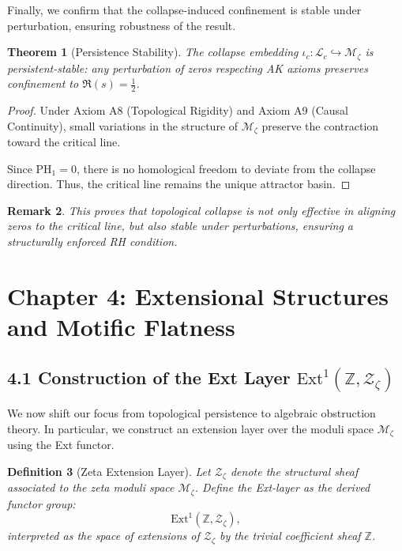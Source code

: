 \documentclass[11pt]{article}
\newtheorem{theorem}{Theorem}[section]
\newtheorem{definition}[theorem]{Definition}
\newtheorem{remark}[theorem]{Remark}
\begin{document}
Finally, we confirm that the collapse-induced confinement is stable under perturbation, ensuring robustness of the result.

\begin{theorem}[Persistence Stability]
The collapse embedding $\iota_c: \mathcal{L}_c \hookrightarrow \mathcal{M}_\zeta$ is persistent-stable:  
any perturbation of zeros respecting AK axioms preserves confinement to $\Re(s) = \tfrac{1}{2}$.
\end{theorem}

\begin{proof}
Under Axiom A8 (Topological Rigidity) and Axiom A9 (Causal Continuity),  
small variations in the structure of $\mathcal{M}_\zeta$ preserve the contraction toward the critical line.

Since $\mathrm{PH}_1 = 0$, there is no homological freedom to deviate from the collapse direction.  
Thus, the critical line remains the unique attractor basin.
\end{proof}

\begin{remark}
This proves that topological collapse is not only effective in aligning zeros to the critical line,  
but also stable under perturbations, ensuring a structurally enforced RH condition.
\end{remark}



\section{Chapter 4: Extensional Structures and Motific Flatness}

\subsection{4.1 Construction of the Ext Layer $\mathrm{Ext}^1(\mathbb{Z}, \mathcal{Z}_\zeta)$}

We now shift our focus from topological persistence to algebraic obstruction theory.  
In particular, we construct an extension layer over the moduli space $\mathcal{M}_\zeta$ using the Ext functor.

\begin{definition}[Zeta Extension Layer]
Let $\mathcal{Z}_\zeta$ denote the structural sheaf associated to the zeta moduli space $\mathcal{M}_\zeta$.  
Define the Ext-layer as the derived functor group:
\[
\mathrm{Ext}^1(\mathbb{Z}, \mathcal{Z}_\zeta),
\]
interpreted as the space of extensions of $\mathcal{Z}_\zeta$ by the trivial coefficient sheaf $\mathbb{Z}$.
\end{definition}
\end{document}
